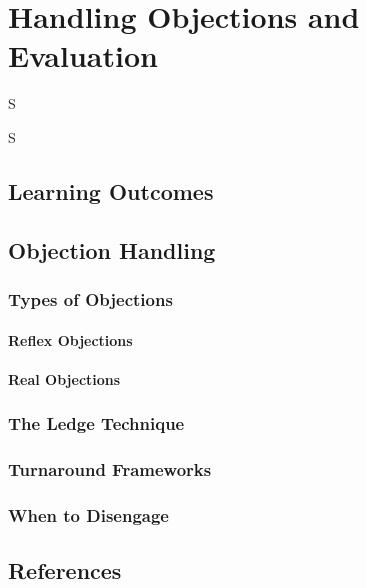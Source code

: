 \frenchspacing
\chapter{Handling Objections and Evaluation}
\epigraph{S}{S}

%
\section{Learning Outcomes}

\section{Objection Handling}\mbox{}
    \subsection{Types of Objections}\mbox{}
        \subsubsection{Reflex Objections}\mbox{}
        \subsubsection{Real Objections}\mbox{}
    \subsection{The Ledge Technique}\mbox{}
    \subsection{Turnaround Frameworks}\mbox{}
    \subsection{When to Disengage}\mbox{}

%
\section{References}